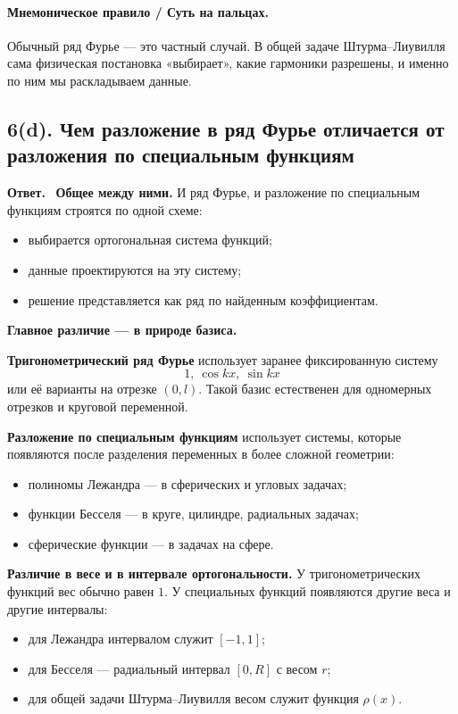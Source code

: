 \documentclass[a4paper,12pt]{article}
\newcommand{\Answer}{\textbf{Ответ.}\ }
\begin{document}
\paragraph{Мнемоническое правило / Суть на пальцах.}
Обычный ряд Фурье --- это частный случай. В общей задаче Штурма--Лиувилля сама физическая постановка «выбирает», какие гармоники разрешены, и именно по ним мы раскладываем данные.

\subsection*{6(d). Чем разложение в ряд Фурье отличается от разложения по специальным функциям}

\Answer
\textbf{Общее между ними.}
И ряд Фурье, и разложение по специальным функциям строятся по одной схеме:
\begin{itemize}
  \item выбирается ортогональная система функций;
  \item данные проектируются на эту систему;
  \item решение представляется как ряд по найденным коэффициентам.
\end{itemize}

\textbf{Главное различие --- в природе базиса.}

\textbf{Тригонометрический ряд Фурье} использует заранее фиксированную систему
\[
1,\ \cos kx,\ \sin kx
\]
или её варианты на отрезке $(0,l)$. Такой базис естественен для одномерных отрезков и круговой переменной.

\textbf{Разложение по специальным функциям} использует системы, которые появляются после разделения переменных в более сложной геометрии:
\begin{itemize}
  \item полиномы Лежандра --- в сферических и угловых задачах;
  \item функции Бесселя --- в круге, цилиндре, радиальных задачах;
  \item сферические функции --- в задачах на сфере.
\end{itemize}

\textbf{Различие в весе и в интервале ортогональности.}
У тригонометрических функций вес обычно равен $1$. У специальных функций появляются другие веса и другие интервалы:
\begin{itemize}
  \item для Лежандра интервалом служит $[-1,1]$;
  \item для Бесселя --- радиальный интервал $[0,R]$ с весом $r$;
  \item для общей задачи Штурма--Лиувилля весом служит функция $\rho(x)$.
\end{itemize}
\end{document}
